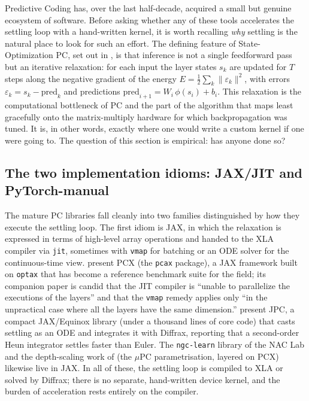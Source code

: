Predictive Coding has, over the last half-decade, acquired a small but genuine ecosystem
of software. Before asking whether any of these tools accelerates the settling loop with a
hand-written kernel, it is worth recalling \emph{why} settling is the natural place to look
for such an effort. The defining feature of State-Optimization PC, set out in
, is that inference is not a single feedforward pass but an iterative
relaxation: for each input the layer states $s_k$ are updated for $T$ steps along the
negative gradient of the energy $E=\tfrac12\sum_k \lVert\varepsilon_k\rVert^2$, with errors
$\varepsilon_k = s_k - \mathrm{pred}_k$ and predictions $\mathrm{pred}_{i+1}=W_i\,\phi(s_i)+b_i$.
This relaxation is the computational bottleneck of PC and the part of the algorithm that
maps least gracefully onto the matrix-multiply hardware for which backpropagation was
tuned. It is, in other words, exactly where one would write a custom kernel if one were
going to. The question of this section is empirical: has anyone done so?

\subsection{The two implementation idioms: JAX/JIT and PyTorch-manual}

The mature PC libraries fall cleanly into two families distinguished by how they execute
the settling loop. The first idiom is JAX, in which the relaxation is expressed in terms of
high-level array operations and handed to the XLA compiler via \texttt{jit}, sometimes
with \texttt{vmap} for batching or an ODE solver for the continuous-time view. \citet{pinchetti2024pcx}
present PCX (the \texttt{pcax} package), a JAX framework built on \texttt{optax} that has
become a reference benchmark suite for the field; its companion paper is candid that the
JIT compiler is ``unable to parallelize the executions of the layers'' and that the
\texttt{vmap} remedy applies only ``in the unpractical case where all the layers have the
same dimension.'' \citet{millidge2024jpc} present JPC, a compact JAX/Equinox library
(under a thousand lines of core code) that casts settling as an ODE and integrates it with
Diffrax, reporting that a second-order Heun integrator settles faster than Euler. The
\texttt{ngc-learn} library of the NAC Lab and the depth-scaling work of
\citet{innocenti2026limits} (the $\mu$PC parametrisation, layered on PCX) likewise live in
JAX. In all of these, the settling loop is compiled to XLA or solved by Diffrax; there is
no separate, hand-written device kernel, and the burden of acceleration rests entirely on
the compiler.

